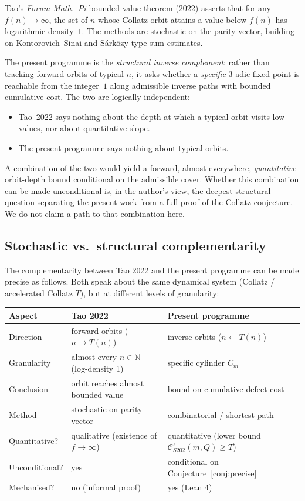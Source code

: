 \documentclass[11pt,a4paper]{article}
\theoremstyle{plain}
\theoremstyle{definition}
\newcommand{\NN}{\mathbb{N}}
\newcommand{\Cback}{\mathcal{C}^{\!\leftarrow}_{S202}}
\begin{document}
Tao's \emph{Forum Math.\ Pi} bounded-value theorem (2022)
asserts that for any $f(n) \to \infty$, the set of $n$ whose
Collatz orbit attains a value below $f(n)$ has logarithmic
density~$1$. The methods are stochastic on the parity vector,
building on Kontorovich--Sinai and Sárközy-type sum estimates.

The present programme is the \emph{structural inverse
complement}: rather than tracking forward orbits of typical $n$,
it asks whether a \emph{specific} 3-adic fixed point is
reachable from the integer~$1$ along admissible inverse paths
with bounded cumulative cost. The two are logically independent:
\begin{itemize}
  \item Tao~2022 says nothing about the depth at which a typical
        orbit visits low values, nor about quantitative slope.
  \item The present programme says nothing about typical orbits.
\end{itemize}

A combination of the two would yield a forward,
almost-everywhere, \emph{quantitative} orbit-depth bound
conditional on the admissible cover. Whether this combination
can be made unconditional is, in the author's view, the deepest
structural question separating the present work from a full
proof of the Collatz conjecture. We do not claim a path to that
combination here.

\subsection{Stochastic vs.\ structural complementarity}

The complementarity between Tao 2022 and the present programme can
be made precise as follows. Both speak about the same dynamical
system (Collatz / accelerated Collatz $T$), but at different
levels of granularity:

\begin{center}\small
\begin{tabular}{p{4cm}p{4.5cm}p{4.5cm}}
\toprule
Aspect & Tao 2022 & Present programme \\
\midrule
Direction & forward orbits ($n \to T(n)$) & inverse orbits ($n \leftarrow T(n)$) \\
Granularity & almost every $n \in \NN$ (log-density 1) & specific cylinder $C_m$ \\
Conclusion & orbit reaches almost bounded value & bound on cumulative defect cost \\
Method & stochastic on parity vector & combinatorial / shortest path \\
Quantitative? & qualitative (existence of $f \to \infty$) & quantitative (lower bound $\Cback(m, Q) \ge T$) \\
Unconditional? & yes & conditional on Conjecture~\ref{conj:precise} \\
Mechanised? & no (informal proof) & yes (Lean 4) \\
\bottomrule
\end{tabular}
\end{center}
\end{document}
